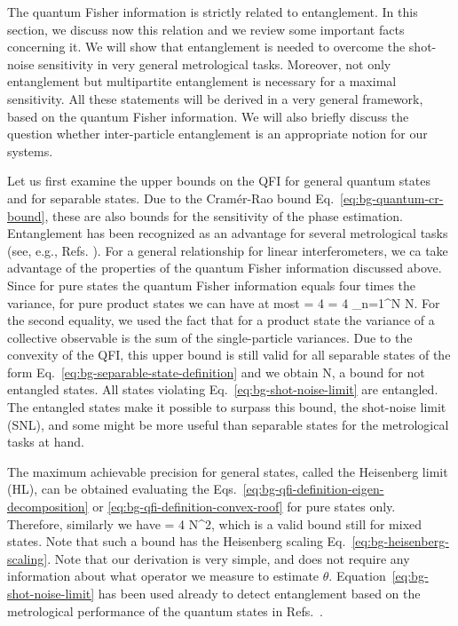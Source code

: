 
The quantum Fisher information is strictly related to entanglement.
In this section, we discuss now this relation and we review some important facts concerning it.
We will show that entanglement is needed to overcome the shot-noise sensitivity in very general metrological tasks.
Moreover, not only entanglement but multipartite entanglement is necessary for a maximal sensitivity.
All these statements will be derived in a very general framework, based on the quantum Fisher information.
We will also briefly discuss the question whether inter-particle entanglement is an appropriate notion for our systems.

Let us first examine the upper bounds on the QFI for general quantum states and for separable states.
Due to the Cram\'er-Rao bound Eq.~\eqref{eq:bg-quantum-cr-bound}, these are also bounds for the sensitivity of the phase estimation.
Entanglement has been recognized as an advantage for several metrological tasks (see, e.g., Refs. \cite{Sorensen2001, Boixo2008}).
For a general relationship for linear interferometers, we ca take advantage of the properties of the quantum Fisher information discussed above.
Since for pure states the quantum Fisher information equals four times the variance, for pure product states we can have at most
\be
   = 4 = 4 \sum_{n=1}^N  \leqslant N.
\ee
For the second equality, we used the fact that for a product state the variance of a collective observable is the sum of the single-particle variances.
Due to the convexity of the QFI, this upper bound is still valid for all separable states of the form Eq.~\eqref{eq:bg-separable-state-definition} and we obtain \cite{Pezze2009}
\be
  \label{eq:bg-shot-noise-limit}
   \leqslant N,
\ee
a bound for not entangled states.
All states violating Eq.~\eqref{eq:bg-shot-noise-limit} are entangled.
The entangled states make it possible to surpass this bound, the shot-noise limit (SNL), and some might be more useful than separable states for the metrological tasks at hand.

The maximum achievable precision for general states, called the Heisenberg limit (HL), can be obtained evaluating the Eqs.~\eqref{eq:bg-qfi-definition-eigen-decomposition} or \eqref{eq:bg-qfi-definition-convex-roof} for pure states only.
Therefore, similarly we have
\be
  \label{eq:bg-heisenberg-limit}
   = 4 \leqslant N^2,
\ee
which is a valid bound still for mixed states.
Note that such a bound has the Heisenberg scaling Eq.~\eqref{eq:bg-heisenberg-scaling}.
Note that our derivation is very simple, and does not require any information about what operator we measure to estimate $\theta$.
Equation~\eqref{eq:bg-shot-noise-limit} has been used already to detect entanglement based on the metrological performance of the quantum states in Refs.~\cite{Krischek2011, Luecke2011}.


